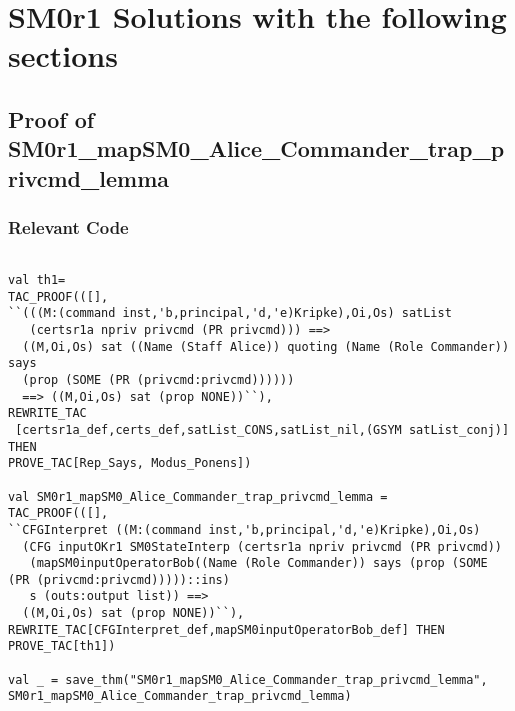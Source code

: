\documentclass{report}
\begin{document}
\chapter{SM0r1 Solutions with the following sections}
\label{sm0r1-solutions}

\section{Proof of SM0r1_mapSM0_Alice_Commander_trap_privcmd_lemma}
\label{proof-3}

\subsection{Relevant Code}
\label{rel-code-3}
\begin{lstlisting}[frame=TBlr]

val th1=
TAC_PROOF(([],
``(((M:(command inst,'b,principal,'d,'e)Kripke),Oi,Os) satList
   (certsr1a npriv privcmd (PR privcmd))) ==>
  ((M,Oi,Os) sat ((Name (Staff Alice)) quoting (Name (Role Commander)) says
  (prop (SOME (PR (privcmd:privcmd))))))
  ==> ((M,Oi,Os) sat (prop NONE))``),
REWRITE_TAC
 [certsr1a_def,certs_def,satList_CONS,satList_nil,(GSYM satList_conj)] THEN
PROVE_TAC[Rep_Says, Modus_Ponens])

val SM0r1_mapSM0_Alice_Commander_trap_privcmd_lemma =
TAC_PROOF(([],
``CFGInterpret ((M:(command inst,'b,principal,'d,'e)Kripke),Oi,Os)
  (CFG inputOKr1 SM0StateInterp (certsr1a npriv privcmd (PR privcmd))
   (mapSM0inputOperatorBob((Name (Role Commander)) says (prop (SOME (PR (privcmd:privcmd)))))::ins)
   s (outs:output list)) ==>
  ((M,Oi,Os) sat (prop NONE))``),
REWRITE_TAC[CFGInterpret_def,mapSM0inputOperatorBob_def] THEN
PROVE_TAC[th1])

val _ = save_thm("SM0r1_mapSM0_Alice_Commander_trap_privcmd_lemma",
SM0r1_mapSM0_Alice_Commander_trap_privcmd_lemma)


\end{lstlisting}
\end{document}
